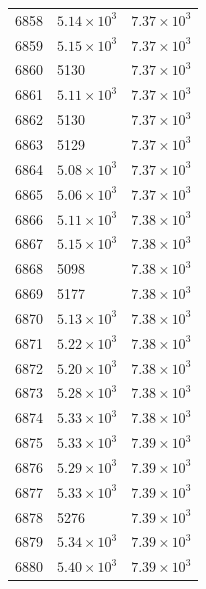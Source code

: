\begin{table}[H]
\begin{tabular}{lll}
6858 & $\displaystyle 5.14 \times 10^{3}$ & $\displaystyle 7.37 \times 10^{3}$ \\
6859 & $\displaystyle 5.15 \times 10^{3}$ & $\displaystyle 7.37 \times 10^{3}$ \\
6860 & 5130 & $\displaystyle 7.37 \times 10^{3}$ \\
6861 & $\displaystyle 5.11 \times 10^{3}$ & $\displaystyle 7.37 \times 10^{3}$ \\
6862 & 5130 & $\displaystyle 7.37 \times 10^{3}$ \\
6863 & 5129 & $\displaystyle 7.37 \times 10^{3}$ \\
6864 & $\displaystyle 5.08 \times 10^{3}$ & $\displaystyle 7.37 \times 10^{3}$ \\
6865 & $\displaystyle 5.06 \times 10^{3}$ & $\displaystyle 7.37 \times 10^{3}$ \\
6866 & $\displaystyle 5.11 \times 10^{3}$ & $\displaystyle 7.38 \times 10^{3}$ \\
6867 & $\displaystyle 5.15 \times 10^{3}$ & $\displaystyle 7.38 \times 10^{3}$ \\
6868 & 5098 & $\displaystyle 7.38 \times 10^{3}$ \\
6869 & 5177 & $\displaystyle 7.38 \times 10^{3}$ \\
6870 & $\displaystyle 5.13 \times 10^{3}$ & $\displaystyle 7.38 \times 10^{3}$ \\
6871 & $\displaystyle 5.22 \times 10^{3}$ & $\displaystyle 7.38 \times 10^{3}$ \\
6872 & $\displaystyle 5.20 \times 10^{3}$ & $\displaystyle 7.38 \times 10^{3}$ \\
6873 & $\displaystyle 5.28 \times 10^{3}$ & $\displaystyle 7.38 \times 10^{3}$ \\
6874 & $\displaystyle 5.33 \times 10^{3}$ & $\displaystyle 7.38 \times 10^{3}$ \\
6875 & $\displaystyle 5.33 \times 10^{3}$ & $\displaystyle 7.39 \times 10^{3}$ \\
6876 & $\displaystyle 5.29 \times 10^{3}$ & $\displaystyle 7.39 \times 10^{3}$ \\
6877 & $\displaystyle 5.33 \times 10^{3}$ & $\displaystyle 7.39 \times 10^{3}$ \\
6878 & 5276 & $\displaystyle 7.39 \times 10^{3}$ \\
6879 & $\displaystyle 5.34 \times 10^{3}$ & $\displaystyle 7.39 \times 10^{3}$ \\
6880 & $\displaystyle 5.40 \times 10^{3}$ & $\displaystyle 7.39 \times 10^{3}$ \\

\end{tabular}
\end{table}
